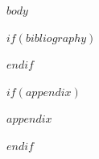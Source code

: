\documentclass[
  12pt,
  oneside,
  a4paper,
  chapter=TITLE,
  english,
  portuguese
]{abntex2}
\begin{document}
\tableofcontents*
\cleardoublepage

\textual
\makeatletter
\let\@afterindentfalse\@afterindenttrue
\makeatother
\setcounter{secnumdepth}{3}
\setlength{\parindent}{1.3cm}

$body$

\postextual

$if(bibliography)$


$endif$

$if(appendix)$
\begin{apendicesenv}
$appendix$
\end{apendicesenv}
$endif$
\end{document}
